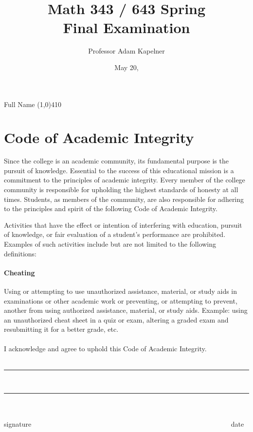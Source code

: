 \documentclass[12pt]{article}
\title{Math 343 / 643 Spring \the\year{} \\ Final Examination}
\author{Professor Adam Kapelner}
\date{May 20, \the\year{}}
\begin{document}
\maketitle

\noindent Full Name \line(1,0){410}

\thispagestyle{empty}

\section*{Code of Academic Integrity}

\footnotesize
Since the college is an academic community, its fundamental purpose is the pursuit of knowledge. Essential to the success of this educational mission is a commitment to the principles of academic integrity. Every member of the college community is responsible for upholding the highest standards of honesty at all times. Students, as members of the community, are also responsible for adhering to the principles and spirit of the following Code of Academic Integrity.

Activities that have the effect or intention of interfering with education, pursuit of knowledge, or fair evaluation of a student's performance are prohibited. Examples of such activities include but are not limited to the following definitions:

\paragraph{Cheating} Using or attempting to use unauthorized assistance, material, or study aids in examinations or other academic work or preventing, or attempting to prevent, another from using authorized assistance, material, or study aids. Example: using an unauthorized cheat sheet in a quiz or exam, altering a graded exam and resubmitting it for a better grade, etc.\\
\\
\noindent I acknowledge and agree to uphold this Code of Academic Integrity. \\~\\

\begin{center}
\rule{350px}{0.4pt}~~~~~~~\rule{80px}{0.4pt}~\\
~~~~~~~~~~~~~~~~~~~~~~~~~~~~~~~~~~~~~~~~~ signature~~~~~~~~~~~~~~~~~~~~~~~~~~~~~~~~~~~~~~~~~~~~~~~~~~~~~~~~~~ date
\end{center}

\normalsize
\end{document}
